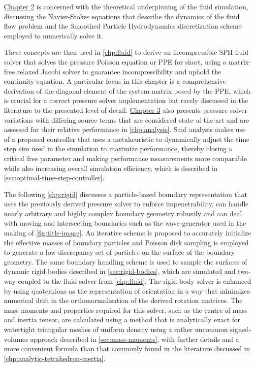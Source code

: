 \documentclass[oneside, a4paper]{book}
\begin{document}
\hyperref[chp:sph]{Chapter 2} is concerned with the theoretical underpinning of the fluid simulation, discussing the Navier-Stokes equations that describe the dynamics of the fluid flow problem and the Smoothed Particle Hydrodynamics discretization scheme employed to numerically solve it. 

These concepts are then used in \autoref{chp:fluid} to derive an incompressible SPH fluid solver that solves the pressure Poisson equation or PPE for short, using a matrix-free relaxed Jacobi solver to guarantee incompressibility and uphold the continuity equation. A particular focus in this chapter is a comprehensive derivation of the diagonal element of the system matrix posed by the PPE, which is crucial for a correct pressure solver implementation but rarely discussed in the literature to the presented level of detail. \hyperref[chp:fluid]{Chapter 3} also presents pressure solver variations with differing source terms that are considered state-of-the-art \autocites{dfsph}{consistent-boundaries} and are assessed for their relative performance in \autoref{chp:analysis}. Said analysis makes use of a proposed controller that uses a metaheuristic to dynamically adjust the time step size used in the simulation to maximize performance, thereby closing a critical free parameter and making performance measurements more comparable while also increasing overall simulation efficiency, which is described in \autoref{sec:optimal-time-step-controller}. 

The following \autoref{chp:rigid} discusses a particle-based boundary representation that uses the previously derived pressure solver to enforce impenetrability, can handle nearly arbitrary and highly complex boundary geometry robustly and can deal with moving and intersecting boundaries such as the wave-generator used in the making of \autoref{fig:title-image}. An iterative scheme is proposed to accurately initialize the effective masses of boundary particles and Poisson disk sampling is employed to generate a low-discrepancy set of particles on the surface of the boundary geometry. The same boundary handling scheme is used to sample the surfaces of dynamic rigid bodies described in \autoref{sec:rigid-bodies}, which are simulated and two-way coupled to the fluid solver from \autoref{chp:fluid}. The rigid body solver is enhanced by using quaternions as the representation of orientation in a way that minimizes numerical drift in the orthonormalization of the derived rotation matrices. The mass moments and properties required for this solver, such as the centre of mass and inertia tensor, are calculated using a method that is analytically exact for watertight triangular meshes of uniform density using a rather uncommon signed-volumes approach described in \autoref{sec:mass-moments}, with further details and a more convenient formula than that commonly found in the literature discussed in \autoref{chp:analytic-tetrahedron-inertia}. 
\end{document}
